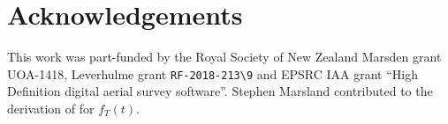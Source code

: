 \documentclass[useAMS, usenatbib, referee]{biom}\usepackage[]{graphicx}\usepackage[]{color}
\begin{document}


\section*{Acknowledgements}
This work was part-funded by the Royal Society of New Zealand  Marsden grant UOA-1418,  Leverhulme grant \verb|RF-2018-213\9| and EPSRC IAA grant ``High Definition digital aerial survey software''. Stephen Marsland contributed to the derivation of for $f_T(t)$.




\end{document}
